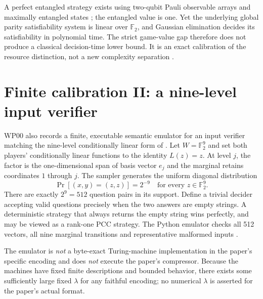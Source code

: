 \documentclass[11pt,a4paper]{article}
\newcommand{\F}{\mathbb{F}}
\begin{document}
A perfect entangled strategy exists using two-qubit Pauli observable arrays and maximally entangled states \cite{jnvwy}; the entangled value is one. Yet the underlying global parity satisfiability system is linear over $\F_2$, and Gaussian elimination decides its satisfiability in polynomial time. The strict game-value gap therefore does not produce a classical decision-time lower bound. It is an exact calibration of the resource distinction, not a new complexity separation \cite{gclmagic}.

\section{Finite calibration II: a nine-level input verifier}
WP00 also records a finite, executable semantic emulator for an input verifier matching the nine-level conditionally linear form of \cite{jnvwy}. Let $W=\F_2^9$ and set both players' conditionally linear functions to the identity $L(z)=z$. At level $j$, the factor is the one-dimensional span of basis vector $e_j$ and the marginal retains coordinates $1$ through $j$. The sampler generates the uniform diagonal distribution
\begin{equation}
\Pr[(x,y)=(z,z)]=2^{-9}\quad\text{for every }z\in\F_2^9.
\end{equation}
There are exactly $2^9=512$ question pairs in its support. Define a trivial decider accepting valid questions precisely when the two answers are empty strings. A deterministic strategy that always returns the empty string wins perfectly, and may be viewed as a rank-one PCC strategy. The Python emulator checks all 512 vectors, all nine marginal transitions and representative malformed inputs \cite{gclwitness}.

The emulator is \emph{not} a byte-exact Turing-machine implementation in the paper's specific encoding and does \emph{not} execute the paper's compressor. Because the machines have fixed finite descriptions and bounded behavior, there exists some sufficiently large fixed $\lambda$ for any faithful encoding; no numerical $\lambda$ is asserted for the paper's actual format.
\end{document}
